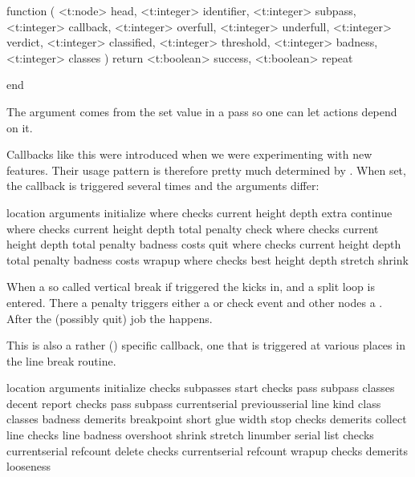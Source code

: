 \starttyping[option=LUA]
function (
    <t:node>    head,
    <t:integer> identifier,
    <t:integer> subpass,
    <t:integer> callback,
    <t:integer> overfull,
    <t:integer> underfull,
    <t:integer> verdict,
    <t:integer> classified,
    <t:integer> threshold,
    <t:integer> badness,
    <t:integer> classes
)
    return
        <t:boolean> success,
        <t:boolean> repeat

end
\stoptyping

The  argument comes from the set value in a pass so one can let
actions depend on it.

\stopsubsection

\startsubsection[title=show_vsplit]

Callbacks like this were introduced when we were experimenting with new features.
Their usage pattern is therefore pretty much determined by \CONTEXT. When set,
the callback is triggered several times and the arguments differ:

\starttabulate[|T|TPl|]
\FL
\NC location   \NC arguments \NC \NR
\ML
\NC initialize \NC where checks current height depth extra \NC \NR
\NC continue   \NC where checks current height depth total penalty \NC \NR
\NC check      \NC where checks current height depth total penalty badness costs \NC \NR
\NC quit       \NC where checks current height depth total penalty badness costs \NC \NR
\NC wrapup     \NC where checks best    height depth stretch shrink \NC \NR
\LL
\stoptabulate

When a so called vertical break if triggered the  kicks in, and
a split loop is entered. There a penalty triggers either a  or \typ
{check} event and other nodes a . After the (possibly quit) job
the  happens.

\stopsubsection

\startsubsection[title=linebreak_check]

This is also a rather (\CONTEXT) specific callback, one that is triggered at
various places in the line break routine.

\starttabulate[|T|TPl|]
\FL
\NC location   \NC arguments \NC \NR
\ML
\NC initialize \NC checks subpasses \NC \NR
\NC start      \NC checks pass subpass classes decent \NC \NR
\NC report     \NC checks pass subpass currentserial previousserial line kind
                   class classes badness demerits breakpoint short glue width \NC \NR
\NC stop       \NC checks demerits \NC \NR
\NC collect    \NC \NC \NR
\NC line       \NC checks line badness overshoot shrink stretch linumber serial \NC \NR
\NC list       \NC checks currentserial refcount \NC \NR
\NC delete     \NC checks currentserial refcount \NC \NR
\NC wrapup     \NC checks demerits looseness \NC \NR
\LL
\stoptabulate

